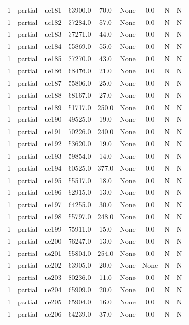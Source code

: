 \begin{table}[ht]
\begin{tabular}{|c|c|c|c|c|c|c|c|c|}
1 & partial & ue181 & 63900.0 & 70.0 & None & 0.0 & N & N \\
1 & partial & ue182 & 37284.0 & 57.0 & None & 0.0 & N & N \\
1 & partial & ue183 & 37271.0 & 44.0 & None & 0.0 & N & N \\
1 & partial & ue184 & 55869.0 & 55.0 & None & 0.0 & N & N \\
1 & partial & ue185 & 37270.0 & 43.0 & None & 0.0 & N & N \\
1 & partial & ue186 & 68476.0 & 21.0 & None & 0.0 & N & N \\
1 & partial & ue187 & 55806.0 & 25.0 & None & 0.0 & N & N \\
1 & partial & ue188 & 68167.0 & 27.0 & None & 0.0 & N & N \\
1 & partial & ue189 & 51717.0 & 250.0 & None & 0.0 & N & N \\
1 & partial & ue190 & 49525.0 & 19.0 & None & 0.0 & N & N \\
1 & partial & ue191 & 70226.0 & 240.0 & None & 0.0 & N & N \\
1 & partial & ue192 & 53620.0 & 19.0 & None & 0.0 & N & N \\
1 & partial & ue193 & 59854.0 & 14.0 & None & 0.0 & N & N \\
1 & partial & ue194 & 60525.0 & 377.0 & None & 0.0 & N & N \\
1 & partial & ue195 & 55517.0 & 18.0 & None & 0.0 & N & N \\
1 & partial & ue196 & 92915.0 & 13.0 & None & 0.0 & N & N \\
1 & partial & ue197 & 64255.0 & 30.0 & None & 0.0 & N & N \\
1 & partial & ue198 & 55797.0 & 248.0 & None & 0.0 & N & N \\
1 & partial & ue199 & 75911.0 & 15.0 & None & 0.0 & N & N \\
1 & partial & ue200 & 76247.0 & 13.0 & None & 0.0 & N & N \\
1 & partial & ue201 & 55804.0 & 254.0 & None & 0.0 & N & N \\
1 & partial & ue202 & 63905.0 & 20.0 & None & None & N & N \\
1 & partial & ue203 & 80236.0 & 11.0 & None & 0.0 & N & N \\
1 & partial & ue204 & 65909.0 & 20.0 & None & 0.0 & N & N \\
1 & partial & ue205 & 65904.0 & 16.0 & None & 0.0 & N & N \\
1 & partial & ue206 & 64239.0 & 37.0 & None & 0.0 & N & N \\

\end{tabular}
\end{table}
